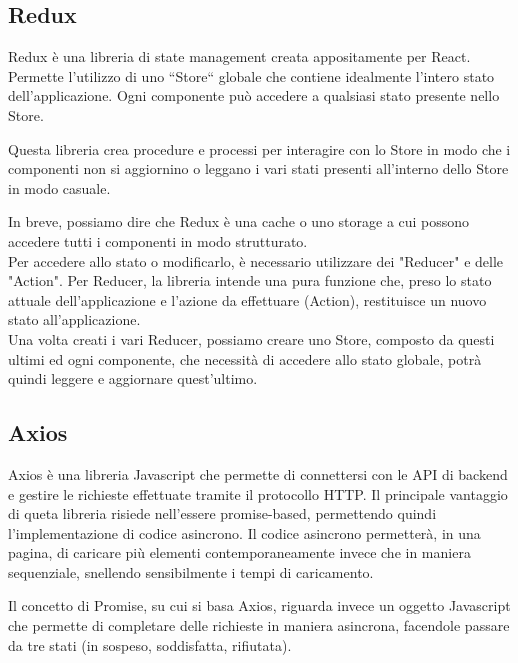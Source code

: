 \documentclass{report}
\begin{document}
\subsection{Redux}
Redux è una libreria di state management creata appositamente per React. Permette l’utilizzo di uno “Store“ globale che contiene idealmente
 l’intero stato dell’applicazione. Ogni componente può accedere a qualsiasi stato presente nello Store.
 \par Questa libreria crea procedure e processi per interagire con lo Store in modo che i componenti non si aggiornino o leggano i vari stati presenti
all’interno dello Store in modo casuale.
\par In breve, possiamo dire che Redux è una cache o uno storage a cui possono accedere tutti i componenti in modo strutturato. 
\\Per accedere allo stato o modificarlo, è necessario utilizzare dei "Reducer" e delle "Action". 
Per Reducer, la libreria intende una pura funzione che, preso lo stato attuale dell’applicazione e l’azione da effettuare (Action), restituisce un nuovo stato all’applicazione.
\\Una volta creati i vari Reducer, possiamo creare uno Store, composto da
questi ultimi ed ogni componente, che necessità di accedere allo stato
globale, potrà quindi leggere e aggiornare quest’ultimo.

\subsection{Axios}
Axios è una libreria Javascript che permette di connettersi con le API di backend e gestire le richieste effettuate tramite il protocollo HTTP.
Il principale vantaggio di queta libreria risiede nell'essere promise-based, permettendo quindi l'implementazione di codice asincrono. Il codice asincrono permetterà, in una pagina, di caricare più elementi contemporaneamente invece che in maniera sequenziale, snellendo sensibilmente i tempi di caricamento.

Il concetto di Promise, su cui si basa Axios, riguarda invece un oggetto Javascript che permette di completare delle richieste in maniera asincrona, facendole passare da tre stati (in sospeso, soddisfatta, rifiutata).
\end{document}
